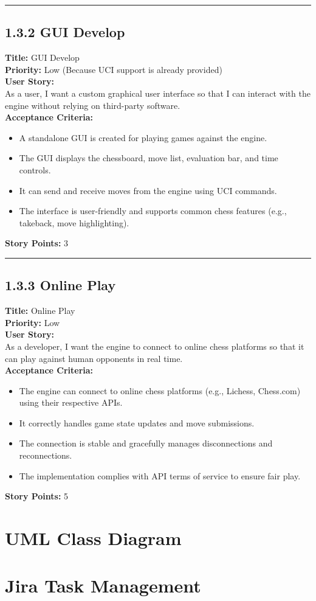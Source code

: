 \documentclass[12pt]{article}
\begin{document}
\bigskip
\hrule
\bigskip

\subsection{1.3.2 GUI Develop}
\textbf{Title:} GUI Develop\\
\textbf{Priority:} Low (Because UCI support is already provided)\\
\textbf{User Story:}\\
As a user, I want a custom graphical user interface so that I can interact with the engine without relying on third-party software.\\
\textbf{Acceptance Criteria:}
\begin{itemize}
    \item A standalone GUI is created for playing games against the engine.
    \item The GUI displays the chessboard, move list, evaluation bar, and time controls.
    \item It can send and receive moves from the engine using UCI commands.
    \item The interface is user-friendly and supports common chess features (e.g., takeback, move highlighting).
\end{itemize}
\textbf{Story Points:} 3

\bigskip
\hrule
\bigskip

\subsection{1.3.3 Online Play}
\textbf{Title:} Online Play\\
\textbf{Priority:} Low\\
\textbf{User Story:}\\
As a developer, I want the engine to connect to online chess platforms so that it can play against human opponents in real time.\\
\textbf{Acceptance Criteria:}
\begin{itemize}
    \item The engine can connect to online chess platforms (e.g., Lichess, Chess.com) using their respective APIs.
    \item It correctly handles game state updates and move submissions.
    \item The connection is stable and gracefully manages disconnections and reconnections.
    \item The implementation complies with API terms of service to ensure fair play.
\end{itemize}
\textbf{Story Points:} 5
\newpage

\section{UML Class Diagram}

\section{Jira Task Management}
\end{document}
